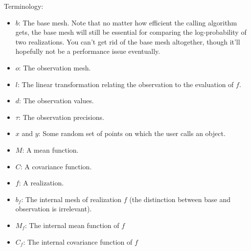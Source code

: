 \documentclass{manual}
\begin{document}
Terminology:
\begin{itemize}
	\item $b$: The base mesh. Note that no matter how efficient the calling algorithm gets, the base mesh will still be essential for comparing the log-probability of two realizations. You can't get rid of the base mesh altogether, though it'll hopefully not be a performance issue eventually.
	\item $o$: The observation mesh.
	\item $l$: The linear transformation relating the observation to the evaluation of $f$.
	\item $d$: The observation values.
	\item $\tau$: The observation precisions.
	\item $x$ and $y$: Some random set of points on which the user calls an object.
	\item $M$: A mean function.
	\item $C$: A covariance function.
	\item $f$: A realization.
	\item $b_f$: The internal mesh of realization $f$ (the distinction between base and observation is irrelevant).
	\item $M_f$: The internal mean function of $f$
	\item $C_f$: The internal covariance function of $f$
\end{itemize}
\end{document}
